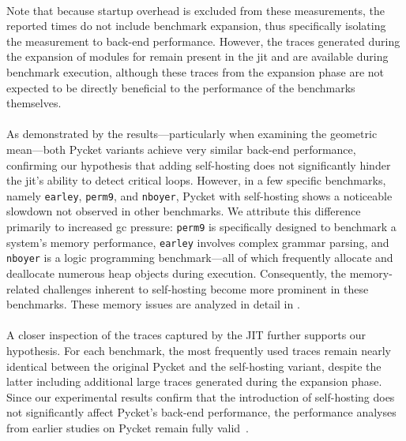 			\paragraph{}%
				Note that because startup overhead is excluded from these measurements, the reported times do not include benchmark expansion, thus specifically isolating the measurement to back-end performance. However, the traces generated during the expansion of modules for  remain present in the \gls{jit} and are available during benchmark execution, although these traces from the expansion phase are not expected to be directly beneficial to the performance of the benchmarks themselves.

			\paragraph{}%
				As demonstrated by the results—particularly when examining the geometric mean—both Pycket variants achieve very similar back-end performance, confirming our hypothesis that adding self-hosting does not significantly hinder the \gls{jit}'s ability to detect critical loops. However, in a few specific benchmarks, namely \texttt{earley}, \texttt{perm9}, and \texttt{nboyer}, Pycket with self-hosting shows a noticeable slowdown not observed in other benchmarks. We attribute this difference primarily to increased \gls{gc} pressure: \texttt{perm9} is specifically designed to benchmark a system's memory performance, \texttt{earley} involves complex grammar parsing, and \texttt{nboyer} is a logic programming benchmark—all of which frequently allocate and deallocate numerous heap objects during execution. Consequently, the memory-related challenges inherent to self-hosting become more prominent in these benchmarks. These memory issues are analyzed in detail in .

			\paragraph{}%
				A closer inspection of the traces captured by the JIT further supports our hypothesis. For each benchmark, the most frequently used traces remain nearly identical between the original Pycket and the self-hosting variant, despite the latter including additional large traces generated during the expansion phase. Since our experimental results confirm that the introduction of self-hosting does not significantly affect Pycket's back-end performance, the performance analyses from earlier studies on Pycket remain fully valid~\cite{pycketmain,pycketmain2}.

